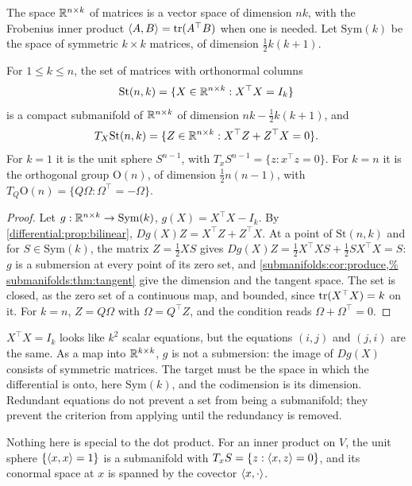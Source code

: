\begin{notechapter}
The space $\mathbb{R}^{n\times k}$ of matrices is a vector space of dimension $nk$,
with the Frobenius inner product $\left\langle A, B \right\rangle = \operatorname{tr}(A^\top B)$ when one is
needed. Let $\mathrm{Sym}(k)$ be the space of symmetric $k\times k$
matrices, of dimension $\frac12k(k + 1)$.

\begin{theorem}
\label{submanifolds:thm:stiefel}
For $1\leq k\leq n$, the set of matrices with orthonormal columns
\[
  \mathrm{St}(n, k) = \{X\in\mathbb{R}^{n\times k} : X^\top X = I_k\}
\]
is a compact submanifold of $\mathbb{R}^{n\times k}$ of dimension
$nk - \frac12k(k + 1)$, and
\[
  T_X\mathrm{St}(n, k) = \{Z\in\mathbb{R}^{n\times k} : X^\top Z + Z^\top X = 0\} .
\]
For $k = 1$ it is the unit sphere $S^{n-1}$, with
$T_xS^{n-1} = \{z : x^\top z = 0\}$. For $k = n$ it is the orthogonal
group $\mathrm O(n)$, of dimension $\frac12n(n - 1)$, with
$T_Q\mathrm O(n) = \{Q\Omega : \Omega^\top = -\Omega\}$.
\end{theorem}

\begin{proof}
Let $g:\mathbb{R}^{n\times k}\to\mathrm{Sym}(k)$, $g(X) = X^\top X - I_k$. By
\cref{differential:prop:bilinear}, $Dg(X)Z = X^\top Z + Z^\top X$. At a
point of $\mathrm{St}(n, k)$ and for $S\in\mathrm{Sym}(k)$, the matrix
$Z = \frac12XS$ gives
$Dg(X)Z = \frac12X^\top XS + \frac12SX^\top X = S$: $g$ is a submersion at
every point of its zero set, and \cref{submanifolds:cor:produce,%
submanifolds:thm:tangent} give the dimension and the tangent space. The
set is closed, as the zero set of a continuous map, and bounded, since
$\operatorname{tr}(X^\top X) = k$ on it. For $k = n$, $Z = Q\Omega$ with
$\Omega = Q^\top Z$, and the condition reads $\Omega + \Omega^\top = 0$.
\end{proof}

\begin{pitfall}
$X^\top X = I_k$ looks like $k^2$ scalar equations, but the equations
$(i, j)$ and $(j, i)$ are the same. As a map into $\mathbb{R}^{k\times k}$, $g$ is
not a submersion: the image of $Dg(X)$ consists of symmetric matrices.
The target must be the space in which the differential is onto, here
$\mathrm{Sym}(k)$, and the codimension is its dimension. Redundant
equations do not prevent a set from being a submanifold; they prevent the
criterion from applying until the redundancy is removed.
\end{pitfall}

Nothing here is special to the dot product. For an inner product on $V$,
the unit sphere $\{\left\langle x, x \right\rangle = 1\}$ is a submanifold with
$T_xS = \{z : \left\langle x, z \right\rangle = 0\}$, and its conormal space at $x$ is spanned
by the covector $\left\langle x, \cdot \right\rangle$.


\end{notechapter}
